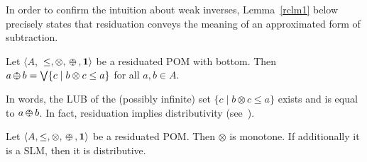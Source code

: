 \documentclass{llncs}
\def\1{{\mathbf 1}}
\newcommand{\shortNoProof}[1]{ }
\def\1{{\mathbf 1}}
\def\monop{\otimes}
\def\odiv{\, {\ominus\hspace{-7.7pt} \div} \,}
\begin{document}
%

In order to confirm the intuition about weak inverses,
Lemma~\ref{rclm1} below precisely states that residuation conveys the meaning of 
an approximated form of subtraction.
%

\begin{lemma}\label{rclm1}
	Let $\langle A,$ $\leq, \otimes,  \odiv, \1 \rangle$ be a residuated POM with bottom.
	Then $a \odiv b = \bigvee \{c \mid b \otimes c \leq a\}$ for all $a, b \in A$.
\end{lemma}

In words, the LUB of the (possibly infinite) set 
$\{c \mid b \otimes c \leq a\}$ exists and is equal to $a \odiv b$.
%
In fact, residuation implies distributivity (see~\cite[Lemma 2.2]{ipl17}).

\begin{lemma}\label{rclm2}
	Let $\langle A, \leq, \monop, \odiv, \1 \rangle$ be a residuated POM. 
	Then $\monop$ is monotone.
	If additionally it is a SLM, then it is distributive.
\end{lemma}

\shortNoProof{
\begin{proof}
	By definition $a \odiv b$ is an upper bound of 
	$\{ c \mid b \monop c \leq a\}$ and $b \monop (a \odiv b) \leq a$.
\qed
\end{proof}
}


\end{document}
